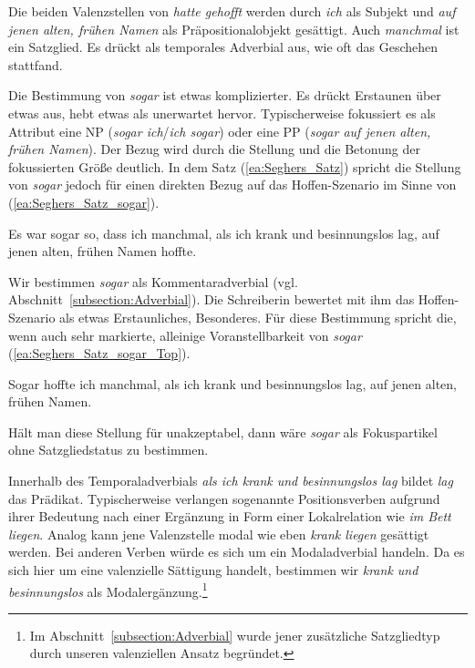 Die beiden Valenzstellen von \textit{hatte gehofft} werden durch \textit{ich} als Subjekt und \textit{auf jenen alten, frühen Namen} als Präpositionalobjekt gesättigt. Auch \textit{manchmal} ist ein Satzglied. Es drückt als temporales Adverbial aus, wie oft das Geschehen stattfand. 

Die Bestimmung von \textit{sogar} ist etwas komplizierter. Es drückt Erstaunen über etwas aus, hebt etwas als unerwartet hervor. Typischerweise fokussiert es als Attribut eine NP (\textit{sogar ich}/\textit{ich sogar}) oder eine PP (\textit{sogar auf jenen alten, frühen Namen}). Der Bezug wird durch die Stellung und die Betonung der fokussierten Größe deutlich. In dem Satz (\ref{ea:Seghers_Satz}) spricht die Stellung von \textit{sogar} jedoch für einen direkten Bezug auf das Hoffen-Szenario im Sinne von (\ref{ea:Seghers_Satz_sogar}).

\ea \label{ea:Seghers_Satz_sogar} Es war sogar so, dass ich manchmal, als ich krank und besinnungslos lag, auf jenen alten, frühen Namen hoffte.
\z 

Wir bestimmen \textit{sogar} als Kommentaradverbial (vgl. Abschnitt~\ref{subsection:Adverbial}). Die Schreiberin bewertet mit ihm das Hoffen-Szenario als etwas Erstaunliches, Besonderes. Für diese Bestimmung spricht die, wenn auch sehr markierte, alleinige Voranstellbarkeit von \textit{sogar} (\ref{ea:Seghers_Satz_sogar_Top}). 

\ea \label{ea:Seghers_Satz_sogar_Top} Sogar hoffte ich manchmal, als ich krank und besinnungslos lag, auf jenen alten, frühen Namen.
\z 

Hält man diese Stellung für unakzeptabel, dann wäre \textit{sogar} als Fokuspartikel ohne Satzgliedstatus zu bestimmen.

Innerhalb des Temporaladverbials \textit{als ich krank und besinnungslos lag} bildet \textit{lag} das Prädikat. Typischerweise verlangen sogenannte Positionsverben aufgrund ihrer Bedeutung nach einer Ergänzung in Form einer Lokalrelation wie \textit{im Bett liegen}. Analog kann jene Valenzstelle modal wie eben \textit{krank liegen} gesättigt werden. Bei anderen Verben würde es sich um ein Modaladverbial handeln. Da es sich hier um eine valenzielle Sättigung handelt, bestimmen wir \textit{krank und besinnungslos} als Modalergänzung.\footnote{Im Abschnitt~\ref{subsection:Adverbial} wurde jener zusätzliche Satzgliedtyp durch unseren valenziellen Ansatz begründet.}

